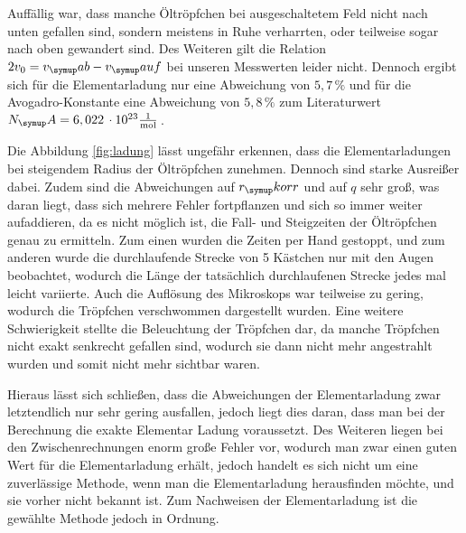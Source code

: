 Auffällig war, dass manche Öltröpfchen bei ausgeschaltetem Feld nicht
nach unten gefallen sind, sondern meistens in Ruhe verharrten, oder
teilweise sogar nach oben gewandert sind. Des Weiteren gilt
die Relation $2v_0 = v_\su{ab}-v_\su{auf}$ bei unseren Messwerten
leider nicht. Dennoch ergibt sich für die Elementarladung nur eine
Abweichung von $5,7\,\%$ und für die Avogadro-Konstante eine
Abweichung von $5,8\,\%$ zum Literaturwert $N_\su{A} = 6,022 \,\cdot 10^{23}\si[per-mode=fraction]{\per\mol}$\,\cite{Na}.

Die Abbildung \ref{fig:ladung} lässt ungefähr erkennen, dass die Elementarladungen
bei steigendem Radius der Öltröpfchen zunehmen. Dennoch sind starke Ausreißer dabei.
Zudem sind die Abweichungen auf $r_\su{korr}$ und auf $q$ sehr
groß, was daran liegt, dass sich mehrere Fehler fortpflanzen und sich
so immer weiter aufaddieren, da es nicht möglich ist, die Fall- und
Steigzeiten der Öltröpfchen genau zu ermitteln. Zum einen wurden die
Zeiten per Hand gestoppt, und zum anderen wurde die durchlaufende Strecke
von 5 Kästchen nur mit den Augen beobachtet, wodurch die Länge der tatsächlich
durchlaufenen Strecke jedes mal leicht variierte. Auch
die Auflösung des Mikroskops war teilweise zu gering, wodurch die Tröpfchen
verschwommen dargestellt wurden. Eine weitere Schwierigkeit stellte die
Beleuchtung der Tröpfchen dar, da manche Tröpfchen nicht exakt senkrecht gefallen
sind, wodurch sie dann nicht mehr angestrahlt wurden und somit nicht mehr sichtbar waren.

Hieraus lässt sich schließen, dass die Abweichungen der Elementarladung zwar
letztendlich nur sehr gering ausfallen, jedoch liegt dies daran, dass man bei der Berechnung
die exakte Elementar Ladung voraussetzt. Des Weiteren liegen bei den Zwischenrechnungen
enorm große Fehler vor, wodurch man zwar einen guten Wert für die Elementarladung erhält,
jedoch handelt es sich nicht um eine zuverlässige Methode, wenn man die Elementarladung herausfinden möchte, und sie vorher nicht bekannt ist. Zum Nachweisen der Elementarladung ist die gewählte Methode jedoch 
in Ordnung.
